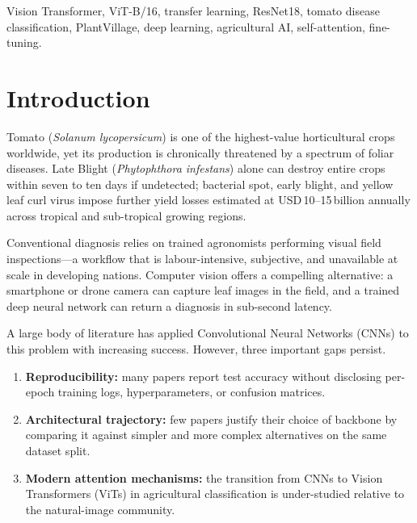 \documentclass[journal]{IEEEtran}
\begin{document}
\begin{IEEEkeywords}
Vision Transformer, ViT-B/16, transfer learning, ResNet18,
tomato disease classification, PlantVillage, deep learning,
agricultural AI, self-attention, fine-tuning.
\end{IEEEkeywords}

\section{Introduction}
\label{sec:intro}

Tomato (\textit{Solanum lycopersicum}) is one of the highest-value
horticultural crops worldwide, yet its production is chronically
threatened by a spectrum of foliar diseases.
Late Blight (\textit{Phytophthora infestans}) alone can destroy
entire crops within seven to ten days if undetected; bacterial
spot, early blight, and yellow leaf curl virus impose further
yield losses estimated at USD\,10--15\,billion annually
across tropical and sub-tropical growing regions.

Conventional diagnosis relies on trained agronomists performing
visual field inspections---a workflow that is labour-intensive,
subjective, and unavailable at scale in developing nations.
Computer vision offers a compelling alternative: a smartphone
or drone camera can capture leaf images in the field, and a
trained deep neural network can return a diagnosis in
sub-second latency.

A large body of literature has applied Convolutional Neural
Networks (CNNs) to this problem with increasing success.
However, three important gaps persist.
\begin{enumerate}
  \item \textbf{Reproducibility:} many papers report test accuracy
        without disclosing per-epoch training logs, hyperparameters,
        or confusion matrices.
  \item \textbf{Architectural trajectory:} few papers justify their
        choice of backbone by comparing it against simpler and more
        complex alternatives on the same dataset split.
  \item \textbf{Modern attention mechanisms:} the transition from
        CNNs to Vision Transformers (ViTs) in agricultural
        classification is under-studied relative to the natural-image
        community.
\end{enumerate}
\end{document}
